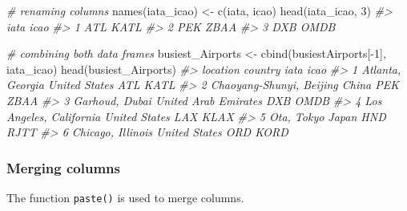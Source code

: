 \documentclass[
]{book}
\newenvironment{Shaded}{\begin{snugshade}}{\end{snugshade}}
\newcommand{\CommentTok}[1]{\textcolor[rgb]{0.56,0.35,0.01}{\textit{#1}}}
\newcommand{\DecValTok}[1]{\textcolor[rgb]{0.00,0.00,0.81}{#1}}
\newcommand{\FunctionTok}[1]{\textcolor[rgb]{0.00,0.00,0.00}{#1}}
\newcommand{\NormalTok}[1]{#1}
\newcommand{\OtherTok}[1]{\textcolor[rgb]{0.56,0.35,0.01}{#1}}
\newcommand{\SpecialCharTok}[1]{\textcolor[rgb]{0.00,0.00,0.00}{#1}}
\newcommand{\StringTok}[1]{\textcolor[rgb]{0.31,0.60,0.02}{#1}}
\begin{document}
\begin{Shaded}
\begin{Highlighting}[]
\CommentTok{\# renaming columns}
\FunctionTok{names}\NormalTok{(iata\_icao) }\OtherTok{\textless{}{-}} \FunctionTok{c}\NormalTok{(}\StringTok{\textquotesingle{}iata\textquotesingle{}}\NormalTok{, }\StringTok{\textquotesingle{}icao\textquotesingle{}}\NormalTok{)}
\FunctionTok{head}\NormalTok{(iata\_icao, }\DecValTok{3}\NormalTok{)}
\CommentTok{\#\textgreater{}   iata icao}
\CommentTok{\#\textgreater{} 1  ATL KATL}
\CommentTok{\#\textgreater{} 2  PEK ZBAA}
\CommentTok{\#\textgreater{} 3  DXB OMDB}

\CommentTok{\# combining both data frames}
\NormalTok{busiest\_Airports }\OtherTok{\textless{}{-}} \FunctionTok{cbind}\NormalTok{(busiestAirports[}\SpecialCharTok{{-}}\DecValTok{1}\NormalTok{], iata\_icao)}
\FunctionTok{head}\NormalTok{(busiest\_Airports)}
\CommentTok{\#\textgreater{}                   location              country iata icao}
\CommentTok{\#\textgreater{} 1         Atlanta, Georgia        United States  ATL KATL}
\CommentTok{\#\textgreater{} 2 Chaoyang{-}Shunyi, Beijing                China  PEK ZBAA}
\CommentTok{\#\textgreater{} 3           Garhoud, Dubai United Arab Emirates  DXB OMDB}
\CommentTok{\#\textgreater{} 4  Los Angeles, California        United States  LAX KLAX}
\CommentTok{\#\textgreater{} 5               Ota, Tokyo                Japan  HND RJTT}
\CommentTok{\#\textgreater{} 6        Chicago, Illinois        United States  ORD KORD}
\end{Highlighting}
\end{Shaded}

\hypertarget{merging-columns}{%
\subsubsection{Merging columns}\label{merging-columns}}

The function \texttt{paste()} is used to merge columns.
\end{document}
